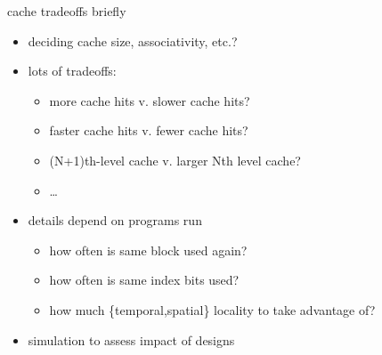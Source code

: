 \begin{frame}{cache tradeoffs briefly}
    \begin{itemize}
    \item deciding cache size, associativity, etc.?
    \item lots of tradeoffs:
        \begin{itemize}
        \item more cache hits v. slower cache hits?
        \item faster cache hits v. fewer cache hits?
        \item (N+1)th-level cache v. larger Nth level cache?
        \item \ldots
        \end{itemize}
    \item details depend on programs run
        \begin{itemize}
        \item how often is same block used again?
        \item how often is same index bits used?
        \item how much \{temporal,spatial\} locality to take advantage of?
        \end{itemize}
    \item simulation to assess impact of designs
    \end{itemize}
\end{frame}
